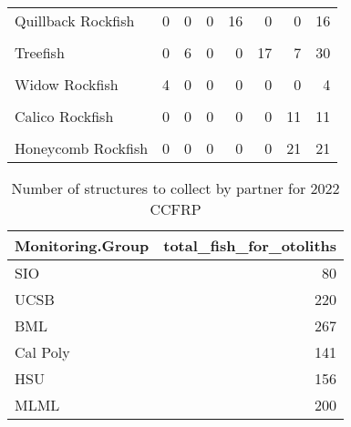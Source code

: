 \documentclass[
]{article}
\begin{document}
\begin{table}
\begin{tabular}[t]{lrrrrrrr}
Quillback Rockfish & 0 & 0 & 0 & 16 & 0 & 0 & 16\\
\cellcolor{gray!6}{Rosy Rockfish} & \cellcolor{gray!6}{8} & \cellcolor{gray!6}{6} & \cellcolor{gray!6}{14} & \cellcolor{gray!6}{18} & \cellcolor{gray!6}{4} & \cellcolor{gray!6}{0} & \cellcolor{gray!6}{50}\\
\addlinespace
Treefish & 0 & 6 & 0 & 0 & 17 & 7 & 30\\
\cellcolor{gray!6}{Vermilion Rockfish} & \cellcolor{gray!6}{9} & \cellcolor{gray!6}{21} & \cellcolor{gray!6}{10} & \cellcolor{gray!6}{11} & \cellcolor{gray!6}{15} & \cellcolor{gray!6}{7} & \cellcolor{gray!6}{73}\\
Widow Rockfish & 4 & 0 & 0 & 0 & 0 & 0 & 4\\
\cellcolor{gray!6}{Yellowtail Rockfish} & \cellcolor{gray!6}{24} & \cellcolor{gray!6}{5} & \cellcolor{gray!6}{8} & \cellcolor{gray!6}{15} & \cellcolor{gray!6}{0} & \cellcolor{gray!6}{0} & \cellcolor{gray!6}{52}\\
Calico Rockfish & 0 & 0 & 0 & 0 & 0 & 11 & 11\\
\addlinespace
\cellcolor{gray!6}{California Scorpionfish} & \cellcolor{gray!6}{0} & \cellcolor{gray!6}{0} & \cellcolor{gray!6}{0} & \cellcolor{gray!6}{0} & \cellcolor{gray!6}{17} & \cellcolor{gray!6}{12} & \cellcolor{gray!6}{29}\\
Honeycomb Rockfish & 0 & 0 & 0 & 0 & 0 & 21 & 21\\
\bottomrule
\end{tabular}
\end{table}

\begin{table}

\caption{\label{tab:partnernumbers}Number of structures to collect by partner for 2022 CCFRP}
\centering
\begin{tabular}[t]{lr}
\toprule
Monitoring.Group & total\_fish\_for\_otoliths\\
\midrule
SIO & 80\\
UCSB & 220\\
BML & 267\\
Cal Poly & 141\\
HSU & 156\\
\addlinespace
MLML & 200\\
\bottomrule
\end{tabular}
\end{table}

\FloatBarrier

\clearpage
\newpage
\end{document}
